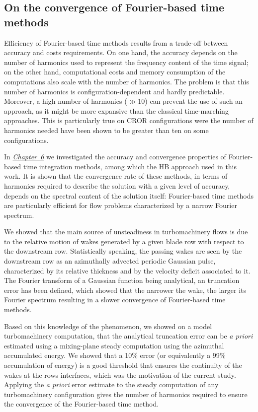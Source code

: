 \subsection*{On the convergence of Fourier-based time methods}

Efficiency of Fourier-based time methods results 
from a trade-off between accuracy and 
costs requirements.
On one hand, the accuracy depends on the number of harmonics
used to represent the frequency content of the time 
signal; on the other hand, computational costs and 
memory consumption of the computations also scale
with the number of harmonics. 
The problem is that this number of harmonics is 
configuration-dependent and hardly predictable. 
Moreover, a high number of harmonics
($\gg 10$) can prevent the use of such an approach,
as it might be more expansive than the classical time-marching approaches.
This is particularly true on CROR configurations were the number
of harmonics needed have been shown to be greater than ten
on some configurations.

In \hyperref[cha:limitations_convergence]{\emph{Chapter~6}}
we investigated the accuracy and convergence properties 
of Fourier-based time integration methods, among which the
HB approach used in this work. It is shown that the convergence rate 
of these methods, in terms of harmonics required to describe the solution 
with a given level of accuracy, depends on the spectral content of the 
solution itself: Fourier-based time methods are particularly efficient 
for flow problems characterized by a narrow Fourier 
spectrum. 

We showed that the main source of unsteadiness in 
turbomachinery flows is due to the relative motion of wakes 
generated by a given blade row with respect to the downstream row.
Statistically speaking, the passing wakes are seen by the downstream 
row as an azimuthally advected periodic Gaussian pulse, 
characterized by its relative thickness
and by the velocity deficit associated to it.
The Fourier transform of a Gaussian function being analytical,
an truncation error has been defined, which showed that the narrower the wake, 
the larger its Fourier spectrum resulting in a slower convergence 
of Fourier-based time methods.

Based on this knowledge of the phenomenon,
we showed on a model turbomachinery computation, that
the analytical truncation error can be \emph{a priori} 
estimated using a mixing-plane steady computation
using the azimuthal accumulated energy.
We showed that a 10\% error (or equivalently 
a 99\% accumulation of energy) is a good threshold
that ensures the continuity of the wakes at the rows
interfaces, which was the motivation of the current study.
Applying the \emph{a priori} error estimate to 
the steady computation of any turbomachinery configuration
gives the number of harmonics required to ensure the
convergence of the Fourier-based time method.

